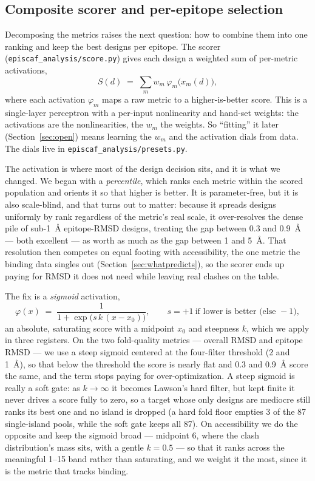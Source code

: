 \subsection{Composite scorer and per-epitope selection}\label{sec:composite}
Decomposing the metrics raises the next question: how to combine them into one ranking and keep the
best designs per epitope. The scorer (\texttt{episcaf\_analysis/score.py}) gives each design a weighted
sum of per-metric activations,
\begin{equation}\label{eq:score}
S(d) \;=\; \sum_{m} w_m\,\varphi_m\!\bigl(x_m(d)\bigr),
\end{equation}
where each activation $\varphi_m$ maps a raw metric to a higher-is-better score. This is a single-layer
perceptron with a per-input nonlinearity and hand-set weights: the activations are the nonlinearities,
the $w_m$ the weights. So ``fitting'' it later (Section~\ref{sec:open}) means learning the $w_m$ and the
activation dials from data. The dials live in \texttt{episcaf\_analysis/presets.py}.

The activation is where most of the design decision sits, and it is what we changed. We began with a
\emph{percentile}, which ranks each metric within the scored population and orients it so that higher is
better. It is parameter-free, but it is also scale-blind, and that turns out to matter: because it
spreads designs uniformly by rank regardless of the metric's real scale, it over-resolves the dense pile
of sub-\SI{1}{\angstrom} epitope-RMSD designs, treating the gap between \SI{0.3}{} and \SI{0.9}{\angstrom}
--- both excellent --- as worth as much as the gap between \SI{1}{} and \SI{5}{\angstrom}. That resolution
then competes on equal footing with accessibility, the one metric the binding data singles out
(Section~\ref{sec:whatpredicts}), so the scorer ends up paying for RMSD it does not need while leaving
real clashes on the table.

The fix is a \emph{sigmoid} activation,
\begin{equation}\label{eq:sigmoid}
\varphi(x) \;=\; \frac{1}{1+\exp\!\bigl(s\,k\,(x-x_0)\bigr)},
\qquad s=+1\ \text{if lower is better (else } -1),
\end{equation}
an absolute, saturating score with a midpoint $x_0$ and steepness $k$, which we apply in three registers.
On the two fold-quality metrics --- overall RMSD and epitope RMSD --- we use a steep sigmoid centered at
the four-filter threshold (2 and \SI{1}{\angstrom}), so that below the threshold the score is nearly flat
and \SI{0.3}{} and \SI{0.9}{\angstrom} score the same, and the term stops paying for over-optimization. A
steep sigmoid is really a soft gate: as $k\to\infty$ it becomes Lawson's hard filter, but kept finite it
never drives a score fully to zero, so a target whose only designs are mediocre still ranks its best one
and no island is dropped (a hard fold floor empties \num{3} of the \num{87} single-island pools, while
the soft gate keeps all \num{87}). On accessibility we do the opposite and keep the sigmoid broad ---
midpoint 6, where the clash distribution's mass sits, with a gentle $k=0.5$ --- so that it ranks across
the meaningful \num{1}--\num{15} band rather than saturating, and we weight it the most, since it is the
metric that tracks binding.

